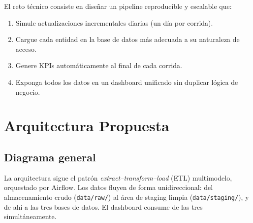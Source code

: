 \documentclass[12pt,a4paper]{article}
\begin{document}
El reto técnico consiste en diseñar un pipeline reproducible y escalable que:
\begin{enumerate}[noitemsep]
    \item Simule actualizaciones incrementales diarias (un día por corrida).
    \item Cargue cada entidad en la base de datos más adecuada a su naturaleza de acceso.
    \item Genere KPIs automáticamente al final de cada corrida.
    \item Exponga todos los datos en un dashboard unificado sin duplicar lógica de negocio.
\end{enumerate}

\section{Arquitectura Propuesta}

\subsection{Diagrama general}

La arquitectura sigue el patrón \textit{extract--transform--load} (ETL) multimodelo,
orquestado por Airflow. Los datos fluyen de forma unidireccional: del almacenamiento
crudo (\texttt{data/raw/}) al área de staging limpia (\texttt{data/staging/}), y de
ahí a las tres bases de datos. El dashboard consume de las tres simultáneamente.
\end{document}
